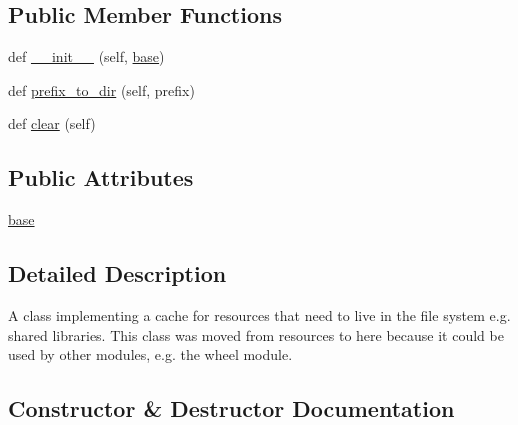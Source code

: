 \subsection*{Public Member Functions}
\begin{DoxyCompactItemize}
\item 
def \hyperlink{classpip_1_1__vendor_1_1distlib_1_1util_1_1Cache_ac009fafb3d612b4f03ddf741faa55670}{\+\_\+\+\_\+init\+\_\+\+\_\+} (self, \hyperlink{classpip_1_1__vendor_1_1distlib_1_1util_1_1Cache_a8c4d3c27a776a3caeb0efa0db1b1d7da}{base})
\item 
def \hyperlink{classpip_1_1__vendor_1_1distlib_1_1util_1_1Cache_aae1f151293a26856b9c4375012ed3eb4}{prefix\+\_\+to\+\_\+dir} (self, prefix)
\item 
def \hyperlink{classpip_1_1__vendor_1_1distlib_1_1util_1_1Cache_a7ceeb94bd1948f47b9db8afb06fb82b2}{clear} (self)
\end{DoxyCompactItemize}
\subsection*{Public Attributes}
\begin{DoxyCompactItemize}
\item 
\hyperlink{classpip_1_1__vendor_1_1distlib_1_1util_1_1Cache_a8c4d3c27a776a3caeb0efa0db1b1d7da}{base}
\end{DoxyCompactItemize}


\subsection{Detailed Description}
\begin{DoxyVerb}A class implementing a cache for resources that need to live in the file system
e.g. shared libraries. This class was moved from resources to here because it
could be used by other modules, e.g. the wheel module.
\end{DoxyVerb}
 

\subsection{Constructor \& Destructor Documentation}
\mbox{\label{classpip_1_1__vendor_1_1distlib_1_1util_1_1Cache_ac009fafb3d612b4f03ddf741faa55670}} 

